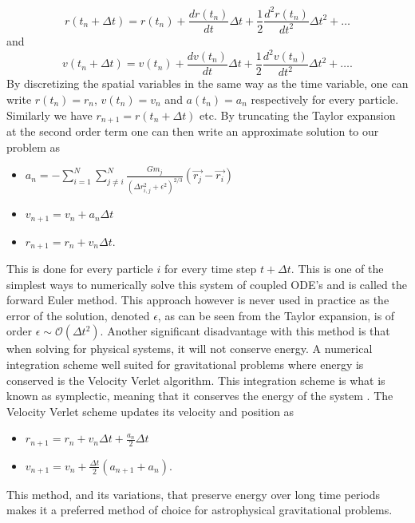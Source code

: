 \begin{equation}
    r(t_n+\Delta t) = r(t_n) + \frac{dr(t_n)}{dt}\Delta t + \frac{1}{2}\frac{d^2r(t_n)}{dt^2}\Delta t^2 +\ldots
\end{equation}
and
\begin{equation}
    v(t_n+\Delta t) = v(t_n) + \frac{dv(t_n)}{dt}\Delta t + \frac{1}{2}\frac{d^2v(t_n)}{dt^2}\Delta t^2 +\ldots.
\end{equation}
By discretizing the spatial variables in the same way as the time variable, one can
write $r(t_n)=r_n$, $v(t_n)=v_n$ and $a(t_n)=a_n$ respectively for every particle.
Similarly we have $r_{n+1}=r(t_n + \Delta t)$ etc.
By truncating the Taylor expansion at the second order term one can then write
an approximate solution to our problem as
\begin{center}
\begin{itemize}
    \item $a_n=-\sum_{i=1}^{N}\sum_{j\neq i}^N\frac{Gm_j}{(\Delta
    r_{i,j}^2+\epsilon^2)^{2/3}}(\vec{r_j}-\vec{r_i})$
    \item $v_{n+1} = v_n + a_n\Delta t$
    \item $r_{n+1} = r_n + v_n\Delta t.$
\end{itemize}
\end{center}
This is done for every particle $i$ for every time step $t+\Delta t$. This is one
of the simplest ways to numerically solve this system of coupled ODE's and is called the forward
Euler method. This approach however is never used in practice as the error of
the solution, denoted $\epsilon$, as can be seen from the Taylor expansion, is of order
$\epsilon\sim\mathcal{O}(\Delta t^2)$. Another significant disadvantage with this method is
that when solving for physical systems, it will not conserve energy. A numerical
integration scheme well suited for gravitational problems where energy is
conserved is the Velocity Verlet algorithm. This integration scheme is what is
known as symplectic, meaning that it conserves the energy of the system
\cite[p.~31]{holmes2007introduction}. The Velocity Verlet scheme updates its
velocity and position as
\begin{center}
    \begin{itemize}
        \item $r_{n+1} = r_n + v_n\Delta t+\frac{a_n}{2}\Delta t$
        \item $v_{n+1} = v_n + \frac{\Delta t}{2}(a_{n+1}+a_n).$
    \end{itemize}
\end{center}
This method, and its variations, that preserve energy over long time periods
makes it a preferred method of choice for astrophysical gravitational problems.
